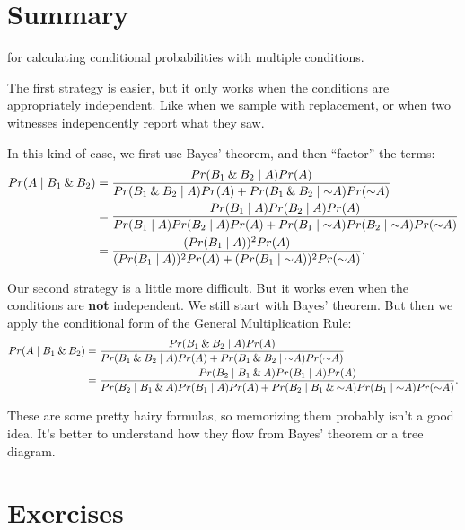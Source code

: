 \documentclass[justified]{tufte-book}
\newcommand{\given}{\mid}
\renewcommand{\neg}{\mathbin{\sim}}
\renewcommand{\wedge}{\mathbin{\&}}
\newcommand{\p}{Pr}
\theoremstyle{definition}
\theoremstyle{definition}
\theoremstyle{definition}
\theoremstyle{remark}
\begin{document}
\hypertarget{summary-2}{%
\section{Summary}\label{summary-2}}

 for calculating conditional probabilities with multiple conditions.

The first strategy is easier, but it only works when the conditions are appropriately independent. Like when we sample with replacement, or when two witnesses independently report what they saw.

In this kind of case, we first use Bayes' theorem, and then ``factor'' the terms:
\[
  \begin{aligned}
    \p(A \given B_1 \wedge B_2) &= 
      \frac{\p(B_1 \wedge B_2 \given A)\p(A)}{%
            \p(B_1 \wedge B_2 \given A)\p(A) +%
              \p(B_1 \wedge B_2 \given \neg A)\p(\neg A)}\\
      &= \frac{\p(B_1 \given A)\p(B_2 \given A)\p(A)}{%
                \p(B_1 \given A)\p(B_2 \given A)\p(A) +%
                  \p(B_1 \given \neg A)\p(B_2 \given \neg A)\p(\neg A)}\\
      &= \frac{(\p(B_1 \given A))^2\p(A)}{%
                (\p(B_1 \given A))^2\p(A) +%
                  (\p(B_1 \given \neg A))^2\p(\neg A)}.
  \end{aligned}
\]

Our second strategy is a little more difficult. But it works even when the conditions are \textbf{not} independent. We still start with Bayes' theorem. But then we apply the conditional form of the General Multiplication Rule:
\[
  \begin{aligned}
    \p(A \given B_1 \wedge B_2) &= 
      \frac{\p(B_1 \wedge B_2 \given A)\p(A)}{%
            \p(B_1 \wedge B_2 \given A)\p(A) +%
              \p(B_1 \wedge B_2 \given \neg A)\p(\neg A)}\\
      &= \frac{\p(B_2 \given B_1 \wedge A)\p(B_1 \given A)\p(A)}{%
                \p(B_2 \given B_1 \wedge A)\p(B_1 \given A)\p(A) +%
                  \p(B_2 \given B_1 \wedge \neg A)\p(B_1 \given \neg A)\p(\neg A)}.
  \end{aligned}
\]

These are some pretty hairy formulas, so memorizing them probably isn't a good idea. It's better to understand how they flow from Bayes' theorem or a tree diagram.

\hypertarget{exercises-7}{%
\section*{Exercises}\label{exercises-7}}
\end{document}
